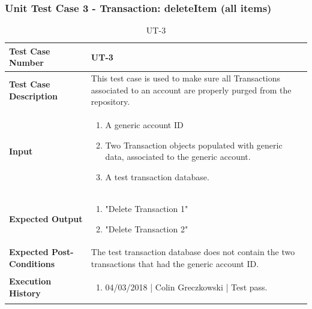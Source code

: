 \documentclass[12pt]{article}
\begin{document}
\subsubsection{Unit Test Case 3 - Transaction: deleteItem (all items)} 
\def\arraystretch{1.5}%
\begin{table}[htbp]
\centering
\caption {UT-3}
\label{UT-3}
\begin{tabularx}{\textwidth}{ | l | X |}
\hline
\textbf{Test Case Number}      &  UT-3                         \\ \hline
\textbf{Test Case Description}    &  This test case is used to make sure all Transactions associated to an account are properly purged from the repository.                \\ \hline
\textbf{Input}         & 	\begin{enumerate}
          \item A generic account ID
	\item Two Transaction objects populated with generic data, associated to the generic account.
	\item A test transaction database.
\end{enumerate} \\ \hline

\textbf{Expected Output}     & \begin{enumerate}
	\item "Delete Transaction 1"
           \item "Delete Transaction 2"
\end{enumerate} \\ \hline
\textbf{Expected Post-Conditions}           & The test transaction database does not contain the two transactions that had the generic account ID.                \\ \hline
\textbf{Execution History}   &  \begin{enumerate}
	\item 04/03/2018 | Colin Greczkowski | Test pass.
\end {enumerate} \\ \hline
\end{tabularx}
\end{table}
\clearpage

\end{document}
